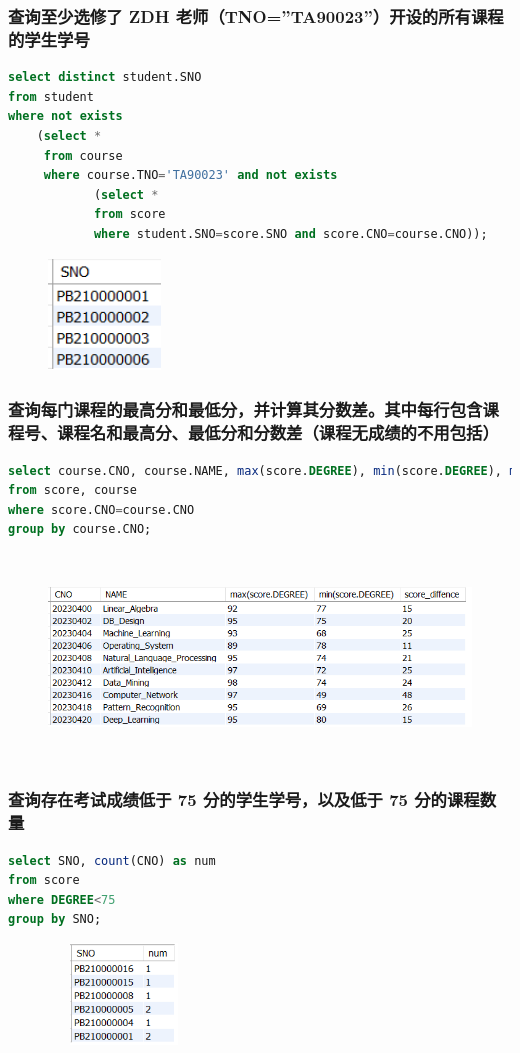 \documentclass{ctexart}
\begin{document}
\subsubsection{查询至少选修了 ZDH 老师（TNO=”TA90023”）开设的所有课程的学生学号}
\begin{lstlisting}[language=sql]
select distinct student.SNO
from student
where not exists
	(select *
	 from course
     where course.TNO='TA90023' and not exists
			(select *
            from score
            where student.SNO=score.SNO and score.CNO=course.CNO));
\end{lstlisting}
\begin{figure}[H]
	\centering 
	\includegraphics[height=3cm,width=3cm]{35.png}
	\end{figure}
\subsubsection{查询每门课程的最高分和最低分，并计算其分数差。其中每行包含课程号、课程名和最高分、最低分和分数差（课程无成绩的不用包括）}
\begin{lstlisting}[language=sql]
select course.CNO, course.NAME, max(score.DEGREE), min(score.DEGREE), max(score.DEGREE)-min(score.DEGREE) as score_diffence
from score, course
where score.CNO=course.CNO
group by course.CNO;
\end{lstlisting}
\begin{figure}[H]
	\centering 
	\includegraphics[height=5.5cm,width=14cm]{36.png}
	\end{figure}
\subsubsection{查询存在考试成绩低于 75 分的学生学号，以及低于 75 分的课程数量}
\begin{lstlisting}[language=sql]
select SNO, count(CNO) as num
from score
where DEGREE<75
group by SNO;
\end{lstlisting}
\begin{figure}[H]
	\centering 
	\includegraphics[height=2.7cm,width=4cm]{37.png}
	\end{figure}
\end{document}
